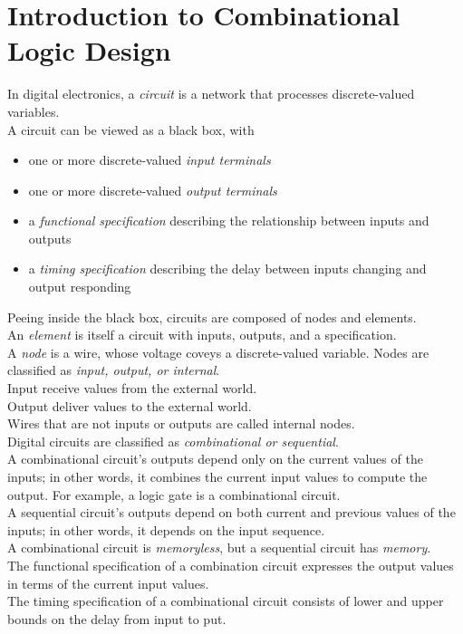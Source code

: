 \documentclass[12pt]{article}
\theoremstyle{definition}
\begin{document}
  \section{Introduction to Combinational Logic Design}
  In digital electronics, a \emph{circuit} is a network that processes discrete-valued variables. \\
  A circuit can be viewed as a black box, with
  \begin{itemize}
    \item one or more discrete-valued \emph{input terminals}
    \item one or more discrete-valued \emph{output terminals}
    \item a \emph{functional specification} describing the relationship between inputs and outputs
    \item a \emph{timing specification} describing the delay between inputs changing and output responding
  \end{itemize}
  Peeing inside the black box, circuits are composed of nodes and elements. \\
  An \emph{element} is itself a circuit with inputs, outputs, and a specification. \\
  A \emph{node} is a wire, whose voltage coveys a discrete-valued variable.
  Nodes are classified as \emph{input, output, \emph{or} internal}. \\
  Input receive values from the external world. \\
  Output deliver values to the external world. \\
  Wires that are not inputs or outputs are called internal nodes. \\

  Digital circuits are classified as \emph{combinational \emph{or} sequential}. \\
  A combinational circuit's outputs depend only on the current values of the inputs; in other words, it combines the current input values to compute the output.
  For example, a logic gate is a combinational circuit. \\
  A sequential circuit's outputs depend on both current and previous values of the inputs; in other words, it depends on the input sequence. \\
  A combinational circuit is \emph{memoryless}, but a sequential circuit has \emph{memory}. \\

  The functional specification of a combination circuit expresses the output values in terms of the current input values. \\
  The timing specification of a combinational circuit consists of lower and upper bounds on the delay from input to put. \\
\end{document}
